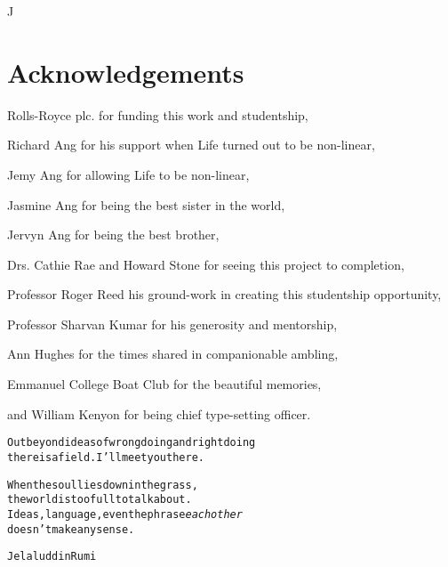 \documentclass[11pt,twoside,a4paper,openright]{report}
\begin{document}
\clearpage
\clearpage

J%




\section*{Acknowledgements}
\hspace{6mm}Rolls-Royce plc. for funding this work and studentship,

Richard Ang for his support when Life turned out to be non-linear,

Jemy Ang for allowing Life to be non-linear,

Jasmine Ang for being the best sister in the world,

Jervyn Ang for being the best brother,

Drs. Cathie Rae and Howard Stone for seeing this project to completion,

Professor Roger Reed his ground-work in creating this studentship opportunity,

Professor Sharvan Kumar for his generosity and mentorship,

Ann Hughes for the times shared in companionable ambling,

Emmanuel College Boat Club for the beautiful memories, 

and William Kenyon for being chief type-setting officer.

\cleardoublepage
{}
\begin{alltt}
\quotewriting
\hspace{3cm}Out beyond ideas of wrongdoing and rightdoing
\hspace{3cm}there is a field.  I'll meet you there.

\hspace{3cm}When the soul lies down in the grass,
\hspace{3cm}the world is too full to talk about.
\hspace{3cm}Ideas, language, even the phrase \textit{each other}
\hspace{3cm}doesn't make any sense.



\hspace{13cm} Jelaluddin Rumi

\end{alltt}
\cleardoublepage
\end{document}
